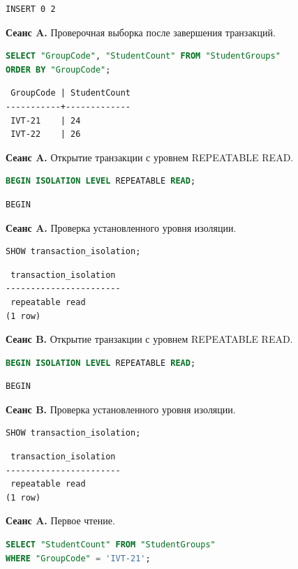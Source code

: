 \documentclass[12pt,a4paper]{article}
\begin{document}
\begin{lstlisting}
INSERT 0 2
\end{lstlisting}

\textbf{Сеанс A.} Проверочная выборка после завершения транзакций.
\begin{lstlisting}[language=SQL]
SELECT "GroupCode", "StudentCount" FROM "StudentGroups"
ORDER BY "GroupCode";
\end{lstlisting}

\begin{lstlisting}
 GroupCode | StudentCount
-----------+-------------
 IVT-21    | 24
 IVT-22    | 26
\end{lstlisting}

\textbf{Сеанс A.} Открытие транзакции с уровнем REPEATABLE READ.
\begin{lstlisting}[language=SQL]
BEGIN ISOLATION LEVEL REPEATABLE READ;
\end{lstlisting}

\begin{lstlisting}
BEGIN
\end{lstlisting}

\textbf{Сеанс A.} Проверка установленного уровня изоляции.
\begin{lstlisting}[language=SQL]
SHOW transaction_isolation;
\end{lstlisting}

\begin{lstlisting}
 transaction_isolation
-----------------------
 repeatable read
(1 row)
\end{lstlisting}

\textbf{Сеанс B.} Открытие транзакции с уровнем REPEATABLE READ.
\begin{lstlisting}[language=SQL]
BEGIN ISOLATION LEVEL REPEATABLE READ;
\end{lstlisting}

\begin{lstlisting}
BEGIN
\end{lstlisting}

\textbf{Сеанс B.} Проверка установленного уровня изоляции.
\begin{lstlisting}[language=SQL]
SHOW transaction_isolation;
\end{lstlisting}

\begin{lstlisting}
 transaction_isolation
-----------------------
 repeatable read
(1 row)
\end{lstlisting}

\textbf{Сеанс A.} Первое чтение.
\begin{lstlisting}[language=SQL]
SELECT "StudentCount" FROM "StudentGroups"
WHERE "GroupCode" = 'IVT-21';
\end{lstlisting}
\end{document}
